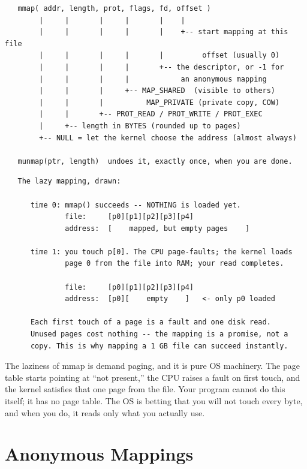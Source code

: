 \begin{verbatim}
   mmap( addr, length, prot, flags, fd, offset )
        |     |       |     |       |    |
        |     |       |     |       |    +-- start mapping at this file
        |     |       |     |       |         offset (usually 0)
        |     |       |     |       +-- the descriptor, or -1 for
        |     |       |     |            an anonymous mapping
        |     |       |     +-- MAP_SHARED  (visible to others)
        |     |       |          MAP_PRIVATE (private copy, COW)
        |     |       +-- PROT_READ / PROT_WRITE / PROT_EXEC
        |     +-- length in BYTES (rounded up to pages)
        +-- NULL = let the kernel choose the address (almost always)

   munmap(ptr, length)  undoes it, exactly once, when you are done.
\end{verbatim}

\begin{verbatim}
   The lazy mapping, drawn:

      time 0: mmap() succeeds -- NOTHING is loaded yet.
              file:     [p0][p1][p2][p3][p4]
              address:  [    mapped, but empty pages    ]

      time 1: you touch p[0]. The CPU page-faults; the kernel loads
              page 0 from the file into RAM; your read completes.

              file:     [p0][p1][p2][p3][p4]
              address:  [p0][    empty    ]   <- only p0 loaded

      Each first touch of a page is a fault and one disk read.
      Unused pages cost nothing -- the mapping is a promise, not a
      copy. This is why mapping a 1 GB file can succeed instantly.
\end{verbatim}

\begin{osconcept}
The laziness of mmap is demand paging, and it is pure OS machinery.
The page table starts pointing at ``not present,'' the CPU raises a
fault on first touch, and the kernel satisfies that one page from the
file. Your program cannot do this itself; it has no page table. The
OS is betting that you will not touch every byte, and when you do, it
reads only what you actually use.
\end{osconcept}

\section{Anonymous Mappings}

